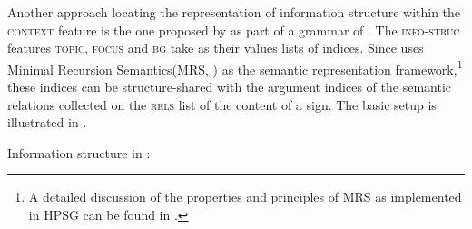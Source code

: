 \documentclass[output=paper,biblatex,babelshorthands,newtxmath,draftmode,colorlinks,citecolor=brown]{langscibook}
\begin{document}
Another approach locating the representation of information structure
within the \textsc{context} feature is the one proposed by
\citet{Paggio2009a-u} as part of a grammar of . The
\textsc{info-struc} features \textsc{topic}, \textsc{focus} and
\textsc{bg} take as their values lists of indices. Since
\citet{Paggio2009a-u} uses Minimal Recursion Semantics\indexmrs (MRS,
\citealt{CFPS2005a}) as the semantic representation framework,\footnote{A detailed
  discussion of the properties and principles of MRS as implemented in
  HPSG can be found in .} these indices
can be structure-shared with the argument indices of the semantic
relations collected on the \textsc{rels} list of the content of a
sign. The basic setup is illustrated in .

\ea\label{fig:paggio-infostr}
Information structure in :\\
        \leavevmode
{}
\z
\end{document}
